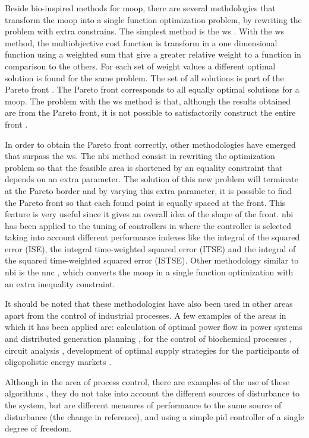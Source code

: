 Beside bio-inspired methods for \gls{moop}, there are several methdologies that transform the \gls{moop} into a single function optimization problem, by rewriting the problem with extra constrains. The simplest method is the \gls{ws} \cite{Marler2004}. With the \gls{ws} method, the multiobjective cost function is transform in a one dimensional function using a weighted sum that give a greater relative weight to a function in comparison to the others. For each set of weight values a different optimal solution is found for the same problem. The set of all solutions is part of the Pareto front \cite{Marler2004}. The Pareto front corresponds to all equally optimal solutions for a \gls{moop}. The problem with the \gls{ws} method is that, although the results obtained are from the Pareto front, it is not possible to satisfactorily construct the entire front \cite{Das1997,Messac2000,Marler2010}.

In order to obtain the Pareto front correctly, other methodologies have emerged that surpass the \gls{ws}. The \gls{nbi} method \cite{Das1998} consist in rewriting the optimization problem so that the feasible area is shortened by an equality constraint that depends on an extra parameter. The solution of this new problem will terminate at the Pareto border and by varying this extra parameter, it is possible to find the Pareto front so that each found point is equally spaced at the front. This feature is very useful since it gives an overall idea of the shape of the front. \gls{nbi} has been applied to the tuning of controllers in \cite{Gambier2009} where the controller is selected taking into account different performance indexes like the integral of the squared error (ISE), the integral time-weighted squared error (ITSE) and the integral of the squared time-weighted squared error (ISTSE). Other methodology similar to \gls{nbi} is the \gls{nnc} \cite{Messac2003}, which converts the \gls{moop} in a single function optimization with an extra inequality constraint.

It should be noted that these methodologies have also been used in other areas apart from the control of industrial processes. A few examples of the areas in which it has been applied are: calculation of optimal power flow in power systems \cite{Roman2006}  and distributed generation planning \cite{Zangeneh2007},  for the control of biochemical processes \cite{Logist2009}, circuit analysis \cite{Stehr2003}, development of optimal supply strategies for the participants of oligopolistic energy markets \cite{Vahidinasab2010}.

Although in the area of process control, there are examples of the use of these algorithms \cite{Gambier2009}, they do not take into account the different sources of disturbance to the system, but are different measures of performance to the same source of disturbance (the change in reference), and using a simple \gls{pid} controller of a single degree of freedom.
